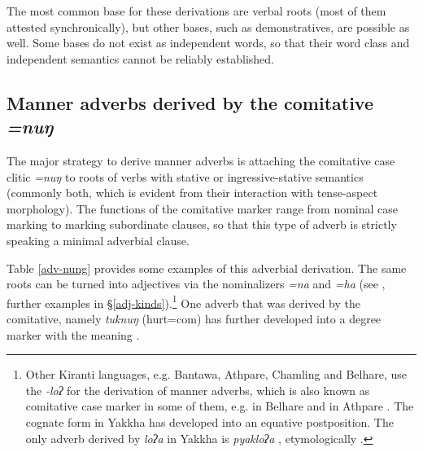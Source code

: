The most common base for these derivations are verbal roots (most of them attested synchronically), but other bases, such  as demonstratives, are possible as well. Some bases do not exist as independent words, so  that their word class and independent semantics cannot be reliably established. 

\subsection{Manner adverbs derived by the comitative \emph{=nuŋ}}
 
The major strategy to derive manner adverbs is attaching the comitative case clitic \emph{=nuŋ} to roots of verbs with stative or ingressive-stative semantics (commonly both, which is evident from their interaction with tense-aspect morphology). The functions of the comitative marker range from nominal case marking to marking subordinate clauses, so that this type of adverb is strictly speaking a minimal adverbial clause.

Table \ref{adv-nung} provides some examples of this adverbial derivation. The same roots can be turned  into adjectives via the nominalizers \emph{=na} and \emph{=ha} (see \Next, further examples in §\ref{adj-kinds}).\footnote{Other Kiranti languages, e.g. Bantawa, Athpare, Chamling and Belhare, use the  \emph{-loʔ} for the derivation of manner adverbs, which is also known as comitative case marker in some of them, e.g. in Belhare \citep[549]{Bickel2003Belhare} and in Athpare \citep[81]{Ebert1994The-structure}. The cognate form in Yakkha has developed into an equative postposition. The only adverb derived by \emph{loʔa} in Yakkha is \emph{pyakloʔa} , etymologically .}  One adverb that was derived by the comitative, namely \emph{tuknuŋ} (hurt={\sc com}) has further developed into a degree marker with the meaning . 
 
